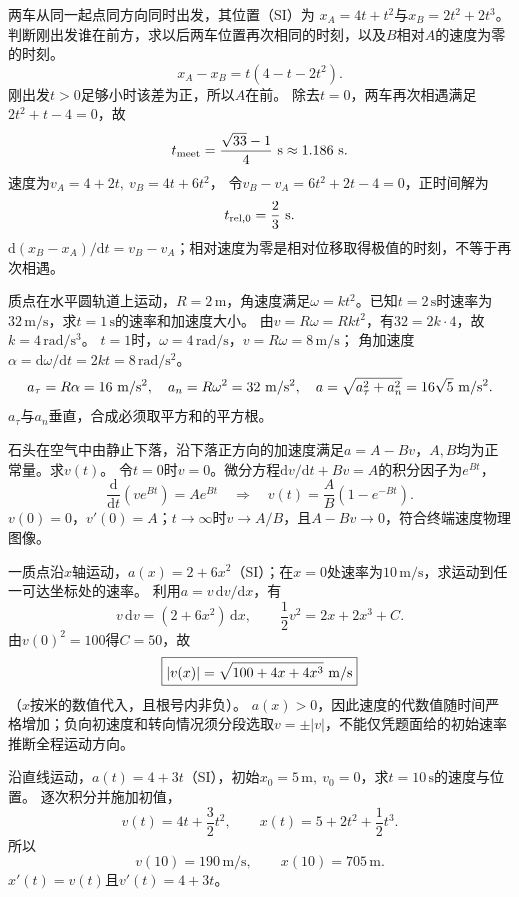 \problemtext 两车从同一起点同方向同时出发，其位置（SI）为
$x_A=4t+t^2$与$x_B=2t^2+2t^3$。判断刚出发谁在前方，求以后两车位置再次相同的时刻，以及$B$相对$A$的速度为零的时刻。
\workings
\[
x_A-x_B=t(4-t-2t^2).
\]
刚出发$t>0$足够小时该差为正，所以$A$在前。
除去$t=0$，两车再次相遇满足$2t^2+t-4=0$，故
\[
t_{\rm meet}=\frac{\sqrt{33}-1}{4}\ {\rm s}\approx1.186\ {\rm s}.
\]
速度为$v_A=4+2t,\ v_B=4t+6t^2$，
令$v_B-v_A=6t^2+2t-4=0$，正时间解为
\[
t_{\rm rel,0}=\frac23\ {\rm s}.
\]
\crosscheck $\mathrm d(x_B-x_A)/\mathrm dt=v_B-v_A$；相对速度为零是相对位移取得极值的时刻，不等于再次相遇。

\problemtext 质点在水平圆轨道上运动，$R=2\,\mathrm m$，角速度满足$\omega=kt^2$。已知$t=2\,\mathrm s$时速率为$32\,\mathrm{m/s}$，求$t=1\,\mathrm s$的速率和加速度大小。
\workings
由$v=R\omega=Rkt^2$，有$32=2k\cdot4$，故$k=4\,\mathrm{rad/s^3}$。
$t=1$时，$\omega=4\,\mathrm{rad/s}$，$v=R\omega=8\,\mathrm{m/s}$；
角加速度$\alpha=\mathrm d\omega/\mathrm dt=2kt=8\,\mathrm{rad/s^2}$。
\[
a_\tau=R\alpha=16\ {\rm m/s^2},\quad
a_n=R\omega^2=32\ {\rm m/s^2},\quad
a=\sqrt{a_\tau^2+a_n^2}=16\sqrt5\ {\rm m/s^2}.
\]
\crosscheck $a_\tau$与$a_n$垂直，合成必须取平方和的平方根。

\problemtext 石头在空气中由静止下落，沿下落正方向的加速度满足$a=A-Bv$，$A,B$均为正常量。求$v(t)$。
\workings
令$t=0$时$v=0$。微分方程$\mathrm dv/\mathrm dt+Bv=A$的积分因子为$e^{Bt}$，
\[
\frac{\mathrm d}{\mathrm dt}(ve^{Bt})=Ae^{Bt}
\quad\Longrightarrow\quad
\boxed{v(t)=\frac AB(1-e^{-Bt})}.
\]
\crosscheck $v(0)=0$，$v'(0)=A$；$t\to\infty$时$v\to A/B$，且$A-Bv\to0$，符合终端速度物理图像。

\problemtext 一质点沿$x$轴运动，$a(x)=2+6x^2$（SI）；在$x=0$处速率为$10\,\mathrm{m/s}$，求运动到任一可达坐标处的速率。
\workings
利用$a=v\,\mathrm dv/\mathrm dx$，有
\[
v\,\mathrm dv=(2+6x^2)\,\mathrm dx,\qquad
\frac12v^2=2x+2x^3+C.
\]
由$v(0)^2=100$得$C=50$，故
\[
\boxed{|v(x)|=\sqrt{100+4x+4x^3}\ {\rm m/s}}
\]
（$x$按米的数值代入，且根号内非负）。
\crosscheck $a(x)>0$，因此速度的代数值随时间严格增加；负向初速度和转向情况须分段选取$v=\pm|v|$，不能仅凭题面给的初始速率推断全程运动方向。

\problemtext 沿直线运动，$a(t)=4+3t$（SI），初始$x_0=5\,\mathrm m,\ v_0=0$，求$t=10\,\mathrm s$的速度与位置。
\workings
逐次积分并施加初值，
\[
v(t)=4t+\frac32t^2,\qquad
x(t)=5+2t^2+\frac12t^3.
\]
所以
\[
\boxed{v(10)=190\,\mathrm{m/s},\qquad x(10)=705\,\mathrm m.}
\]
\crosscheck $x'(t)=v(t)$且$v'(t)=4+3t$。

